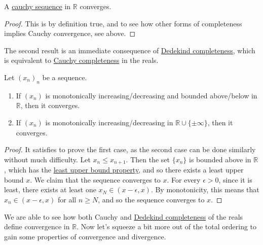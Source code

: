   \begin{theorem}
    \label{thm:cauchy-convergence-criterion}
    A \hyperref[def:cauchy-sequence]{cauchy sequence} in $\mathbb{R}$ converges. 
  \end{theorem} 
  \begin{proof}
    This is by definition true, and to see how other forms of completeness implies Cauchy convergence, see above. 
  \end{proof}

  The second result is an immediate consequence of \hyperref[def:dedekind-completeness]{Dedekind completeness}, which is equivalent to \hyperref[def:cauchy-completeness]{Cauchy completeness} in the reals.  

  \begin{theorem}
    \label{thm:monotone-convergence}
    Let $(x_n)_n$ be a sequence. 
    \begin{enumerate}
      \item If $(x_n)$ is monotonically increasing/decreasing and bounded above/below in $\mathbb{R}$, then it converges. 
      \item If $(x_n)$ is monotonically increasing/decreasing in $\mathbb{R} \cup \{\pm \infty\}$, then it converges. 
    \end{enumerate}
  \end{theorem}
  \begin{proof}
    It satisfies to prove the first case, as the second case can be done similarly without much difficulty. Let $x_n \leq x_{n+1}$. Then the set $\{x_n\}$ is bounded above in $\mathbb{R}$, which has the \hyperref[def:least-upper-bound-property]{least upper bound property}, and so there exists a least upper bound $x$. We claim that the sequence converges to $x$. For every $\epsilon > 0$, since it is least, there exists at least one $x_N \in (x - \epsilon, x)$. By monotonicity, this means that $x_n \in (x - \epsilon, x)$ for all $n \geq N$, and so the sequence converges to $x$. 
  \end{proof}

  We are able to see how both Cauchy and \hyperref[def:dedekind-completeness]{Dedekind completeness} of the reals define convergence in $\mathbb{R}$. Now let's squeeze a bit more out of the total ordering to gain some properties of convergence and divergence.   
  

